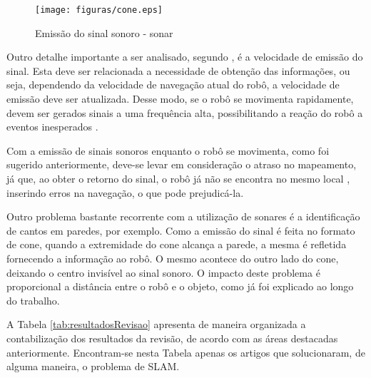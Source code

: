 			\begin{figure}[H]
				\centering
				\texttt{[image: figuras/cone.eps]}
				\caption[Emissão do Sinal Sonoro - Sonar]{Emissão do sinal sonoro - sonar}
				\label{img:cone}
			\end{figure}

			Outro detalhe importante a ser analisado, segundo \cite{agenteExploratorioKalman}, é a velocidade de emissão do sinal. Esta deve ser relacionada a necessidade de obtenção das informações, ou seja, dependendo da velocidade de navegação atual do robô, a velocidade de emissão deve ser atualizada. Desse modo, se o robô se movimenta rapidamente, devem ser gerados sinais a uma frequência alta, possibilitando a reação do robô a eventos inesperados \cite{agenteExploratorioKalman}.

			Com a emissão de sinais sonoros enquanto o robô se movimenta, como foi sugerido anteriormente, deve-se levar em consideração o atraso no mapeamento, já que, ao obter o retorno do sinal, o robô já não se encontra no mesmo local \cite{agenteExploratorioKalman}, inserindo erros na navegação, o que pode prejudicá-la.

			Outro problema bastante recorrente com a utilização de sonares é a identificação de cantos em paredes, por exemplo. Como a emissão do sinal é feita no formato de cone, quando a extremidade do cone alcança a parede, a mesma é refletida fornecendo a informação ao robô. O mesmo acontece do outro lado do cone, deixando o centro invisível ao sinal sonoro. O impacto deste problema é proporcional a distância entre o robô e o objeto, como já foi explicado ao longo do trabalho.


	A Tabela \ref{tab:resultadosRevisao} apresenta de maneira organizada a contabilização dos resultados da revisão, de acordo com as áreas destacadas anteriormente. Encontram-se nesta Tabela apenas os artigos que solucionaram, de alguma maneira, o problema de SLAM.

